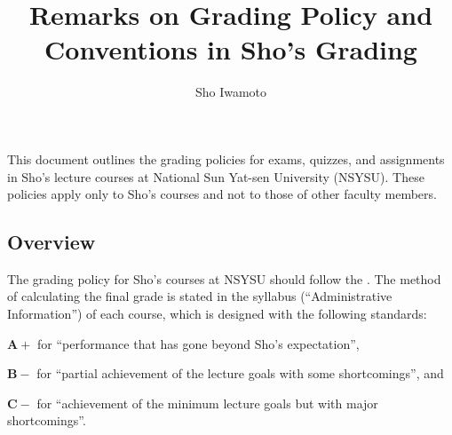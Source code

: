 \documentclass[11pt,pdfa,lastpage,minititle]{MishoNote}
\title{Remarks on Grading Policy and Conventions in Sho's Grading}
\author{Sho Iwamoto}
\begin{document}
\maketitle

This document outlines the grading policies for exams, quizzes, and assignments in Sho's lecture courses at National Sun Yat-sen University (NSYSU).
These policies apply only to Sho’s courses and not to those of other faculty members.

\subsection*{Overview}
The grading policy for Sho's courses at NSYSU should follow the .
The method of calculating the final grade is stated in the syllabus (``Administrative Information'') of each course, which is designed with the following standards:
\begin{miniitemize}
  \item $\mathbfup{A+}$ for ``performance that has gone beyond Sho's expectation'',
  \item $\mathbfup{B-}$ for ``partial achievement of the lecture goals with some shortcomings'', and
  \item $\mathbfup{C-}$ for ``achievement of the minimum lecture goals but with major shortcomings''.
\end{miniitemize}
\OutputNote
\end{document}
